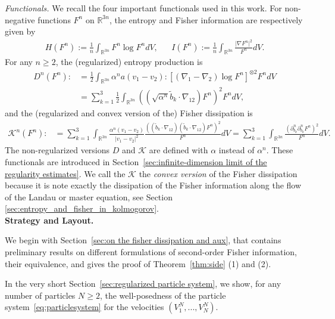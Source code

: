 \documentclass[11pt,a4paper]{article}
\theoremstyle{definition}
\theoremstyle{plain}
\begin{document}
\noindent \textit{Functionals.} We recall the four important functionals used in this work. For non-negative functions $F^n$ on $\mathbb{R}^{3n}$, the entropy and Fisher information are respectively given by
\begin{align*}
    H(F^n):= \frac{1}{n}\int_{\mathbb{R}^{3n}} F^n \log F^n dV,
    &&I(F^n):= \frac{1}{n}\int_{\mathbb{R}^{3n}} \frac{\vert \nabla F^n \vert^2}{F^n} dV.
\end{align*}
For any $n\geq 2$, the (regularized) entropy production is
\begin{align*}
    D^n(F^n):&= \frac{1}{2}\int_{\mathbb{R}^{3n}} \alpha^n a(v_1-v_2):\left[(\nabla_1-\nabla_2)\log{F^n}\right]^{\otimes 2} F^n dV\\
    &=\sum_{k=1}^3 \frac{1}{2}\int_{\mathbb{R}^{3n}} \left(( \sqrt{\alpha^n} \tilde{b}_k\cdot \nabla_{12})F^n \right)^2 F^n dV,
\end{align*}
and the (regularized and convex version of the) Fisher dissipation is
\begin{align*}
    \mathcal{K}^n(F^n):&=\sum_{k=1}^3 \int_{\mathbb{R}^{3n}} \frac{\alpha^n(v_1-v_2)}{\vert v_1-v_2 \vert^2} \frac{\left( (\tilde{b}_k\cdot \nabla_{12})( \tilde{b}_k\cdot \nabla_{12})F^n \right)^2}{F^n} dV
    =\sum_{k=1}^3 \int_{\mathbb{R}^{3n}} \frac{\left( \partial^n_{b_k} \partial^n_{b_k}F^n \right)^2}{F^n} dV.
\end{align*}
The non-regularized versions $D$ and $\mathcal{K}$ are defined with $\alpha$ instead of $\alpha^n$. These functionals are introduced in Section~\ref{sec:infinite-dimension limit of the regularity estimates}. We call the $\mathcal{K}$ the \textit{convex version} of the Fisher dissipation because it is note exactly the dissipation of the Fisher information along the flow of the Landau or master equation, see Section \ref{sec:entropy_and_fisher_in_kolmogorov}.
\\

\noindent \textbf{Strategy and Layout.}

We begin with Section~\ref{sec:on the fisher dissipation and aux}, that contains preliminary results on different formulations of second-order Fisher information, their equivalence, and gives the proof of Theorem~\ref{thm:side} (1) and (2).

In the very short Section~\ref{sec:regularized particle system}, we show, for any number of particles $N\geq 2$, the well-posedness of the particle system~\eqref{eq:particlesystem} for the velocities $(V^N_1,...,V^N_N)$.
\end{document}
